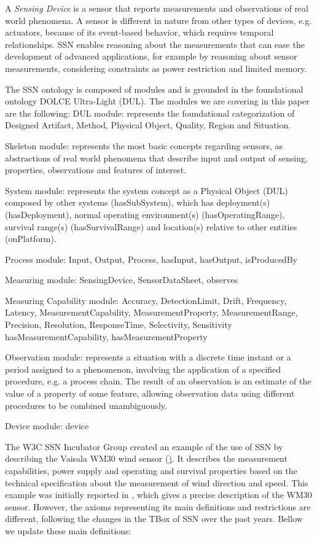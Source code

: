 \documentclass{sig-alternate-05-2015}
\begin{document}
A \textit{Sensing Device} is a sensor that reports measurements and observations of real world phenomena. A sensor is different in nature from other types of devices, e.g. actuators, because of its event-based behavior, which requires temporal relationships. SSN enables reasoning about the measurements that can ease the development of advanced applications, for example by reasoning about sensor measurements, considering constraints as power restriction and limited memory. 

The SSN ontology is composed of modules and is grounded in the foundational ontology DOLCE Ultra-Light (DUL). The modules we are covering in this paper are the following:
DUL module: represents the foundational categorization of Designed Artifact, Method, Physical Object, Quality, Region and Situation.  

Skeleton module: represents the most basic concepts regarding sensors, as abstractions of real world phenomena that describe input and output of sensing, properties, observations and features of interest.

System module: represents the system concept as a Physical Object (DUL) composed by other systems (hasSubSystem), which has deployment(s) (hasDeployment), normal operating environment(s) (hasOperatingRange), survival range(s) (hasSurvivalRange) and location(s) relative to other entities (onPlatform).

Process module: Input, Output, Process, hasInput, hasOutput, isProducedBy

Measuring module: SensingDevice, SensorDataSheet, observes

Measuring Capability module: Accuracy, DetectionLimit, Drift, Frequency, Latency, MeasurementCapability, MeasurementProperty, MeasurementRange, Precision, Resolution, ResponseTime, Selectivity, Sensitivity	hasMeasurementCapability, hasMeasurementProperty

Observation module: represents a situation with a discrete time instant or a period assigned to a phenomenon, involving the application of a specified procedure, e.g. a process chain. The result of an observation is an estimate of the value of a property of some feature, allowing observation data using different procedures to be combined unambiguously. 

Device module: device

The W3C SSN Incubator Group created an example of the use of SSN by describing the Vaisala WM30 wind sensor (\href{https://www.w3.org/2005/Incubator/ssn/ssnx/meteo/WM30.html}). It describes the measurement capabilities, power supply and operating and survival properties based on the technical specification about the measurement of wind direction and speed. This example was initially reported in \cite{Compton2009}, which gives a precise description of the WM30 sensor. However, the axioms representing its main definitions and restrictions are different, following the changes in the TBox of SSN over the past years. Bellow we update these main definitions:
\end{document}
